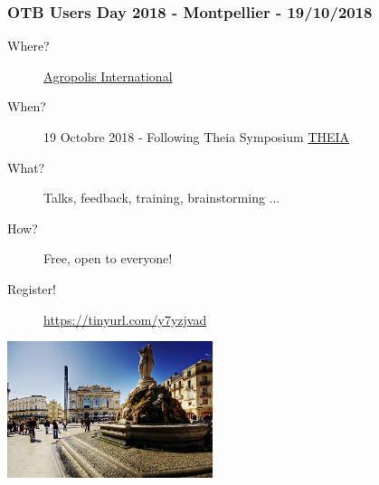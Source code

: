 \documentclass[8pt]{beamer}
\begin{document}
\begin{frame}
  \frametitle{OTB Users Day 2018 - Montpellier - 19/10/2018}
  \begin{description}
  \item[Where?] \href{http://www.agropolis.fr/pratique/locaux.php}{Agropolis International}
  \item[When?] 19 Octobre 2018 - Following Theia Symposium \href{http://theia2018.sciencesconf.org}{THEIA}
  \item[What?] Talks, feedback, training, brainstorming ...
  \item[How?] Free, open to everyone!
  \item[Register!] \url{https://tinyurl.com/y7yzjvad}
  \end{description}
  \begin{center}
    \includegraphics[width=0.45\textwidth]{../foss4gfr-2018/images/montpellier.jpg}
  \end{center}  
\end{frame}
\end{document}
